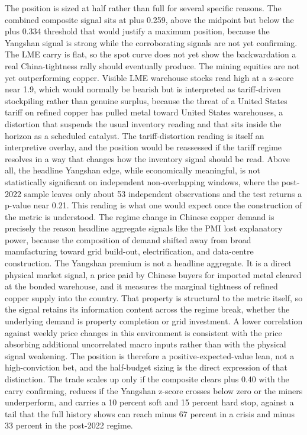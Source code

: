 \documentclass[11pt,a4paper]{article}
\begin{document}
The position is sized at half rather than full for several specific reasons. The combined composite signal sits at plus 0.259, above the midpoint but below the plus 0.334 threshold that would justify a maximum position, because the Yangshan signal is strong while the corroborating signals are not yet confirming. The LME carry is flat, so the spot curve does not yet show the backwardation a real China-tightness rally should eventually produce. The mining equities are not yet outperforming copper. Visible LME warehouse stocks read high at a z-score near 1.9, which would normally be bearish but is interpreted as tariff-driven stockpiling rather than genuine surplus, because the threat of a United States tariff on refined copper has pulled metal toward United States warehouses, a distortion that suspends the usual inventory reading and that sits inside the horizon as a scheduled catalyst. The tariff-distortion reading is itself an interpretive overlay, and the position would be reassessed if the tariff regime resolves in a way that changes how the inventory signal should be read. Above all, the headline Yangshan edge, while economically meaningful, is not statistically significant on independent non-overlapping windows, where the post-2022 sample leaves only about 53 independent observations and the test returns a p-value near 0.21. This reading is what one would expect once the construction of the metric is understood. The regime change in Chinese copper demand is precisely the reason headline aggregate signals like the PMI lost explanatory power, because the composition of demand shifted away from broad manufacturing toward grid build-out, electrification, and data-centre construction. The Yangshan premium is not a headline aggregate. It is a direct physical market signal, a price paid by Chinese buyers for imported metal cleared at the bonded warehouse, and it measures the marginal tightness of refined copper supply into the country. That property is structural to the metric itself, so the signal retains its information content across the regime break, whether the underlying demand is property completion or grid investment. A lower correlation against weekly price changes in this environment is consistent with the price absorbing additional uncorrelated macro inputs rather than with the physical signal weakening. The position is therefore a positive-expected-value lean, not a high-conviction bet, and the half-budget sizing is the direct expression of that distinction. The trade scales up only if the composite clears plus 0.40 with the carry confirming, reduces if the Yangshan z-score crosses below zero or the miners underperform, and carries a 10 percent soft and 15 percent hard stop, against a tail that the full history shows can reach minus 67 percent in a crisis and minus 33 percent in the post-2022 regime.
\end{document}
